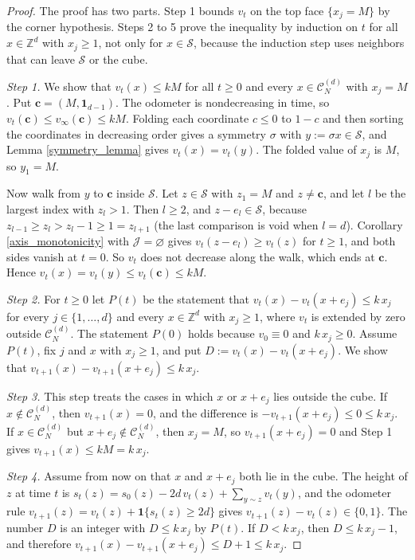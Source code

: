 \documentclass[12pt]{amsart}
\begin{document}
	\begin{proof}
The proof has two parts. Step 1 bounds $v_t$ on the top face $\{x_j=M\}$ by the corner hypothesis. Steps 2 to 5 prove the inequality by induction on $t$ for all $x \in \mathbb{Z}^d$ with $x_j \geq 1$, not only for $x \in \mathcal{S}$, because the induction step uses neighbors that can leave $\mathcal{S}$ or the cube.

\emph{Step 1.} We show that $v_t(x) \leq kM$ for all $t \geq 0$ and every $x \in \mathcal{C}_N^{(d)}$ with $x_j = M$. Put $\mathbf{c} = (M, \mathbf{1}_{d-1})$. The odometer is nondecreasing in time, so $v_t(\mathbf{c}) \leq v_\infty(\mathbf{c}) \leq kM$. Folding each coordinate $c \leq 0$ to $1-c$ and then sorting the coordinates in decreasing order gives a symmetry $\sigma$ with $y := \sigma x \in \mathcal{S}$, and Lemma \ref{symmetry_lemma} gives $v_t(x) = v_t(y)$. The folded value of $x_j$ is $M$, so $y_1 = M$.

Now walk from $y$ to $\mathbf{c}$ inside $\mathcal{S}$. Let $z \in \mathcal{S}$ with $z_1 = M$ and $z \neq \mathbf{c}$, and let $l$ be the largest index with $z_l > 1$. Then $l \geq 2$, and $z - e_l \in \mathcal{S}$, because $z_{l-1} \geq z_l > z_l - 1 \geq 1 = z_{l+1}$ (the last comparison is void when $l = d$). Corollary \ref{axis_monotonicity} with $\mathcal{J} = \varnothing$ gives $v_t(z - e_l) \geq v_t(z)$ for $t \geq 1$, and both sides vanish at $t = 0$. So $v_t$ does not decrease along the walk, which ends at $\mathbf{c}$. Hence $v_t(x) = v_t(y) \leq v_t(\mathbf{c}) \leq kM$.

\emph{Step 2.} For $t \geq 0$ let $P(t)$ be the statement that $v_t(x) - v_t(x+e_j) \leq k\,x_j$ for every $j \in \{1, \ldots, d\}$ and every $x \in \mathbb{Z}^d$ with $x_j \geq 1$, where $v_t$ is extended by zero outside $\mathcal{C}_N^{(d)}$. The statement $P(0)$ holds because $v_0 \equiv 0$ and $k\,x_j \geq 0$. Assume $P(t)$, fix $j$ and $x$ with $x_j \geq 1$, and put $D := v_t(x) - v_t(x+e_j)$. We show that $v_{t+1}(x) - v_{t+1}(x+e_j) \leq k\,x_j$.

\emph{Step 3.} This step treats the cases in which $x$ or $x+e_j$ lies outside the cube. If $x \notin \mathcal{C}_N^{(d)}$, then $v_{t+1}(x) = 0$, and the difference is $-v_{t+1}(x+e_j) \leq 0 \leq k\,x_j$. If $x \in \mathcal{C}_N^{(d)}$ but $x+e_j \notin \mathcal{C}_N^{(d)}$, then $x_j = M$, so $v_{t+1}(x+e_j) = 0$ and Step 1 gives $v_{t+1}(x) \leq kM = k\,x_j$.

\emph{Step 4.} Assume from now on that $x$ and $x+e_j$ both lie in the cube. The height of $z$ at time $t$ is $s_t(z) = s_0(z) - 2d\,v_t(z) + \sum_{y \sim z} v_t(y)$, and the odometer rule $v_{t+1}(z) = v_t(z) + \mathbf{1}\{s_t(z) \geq 2d\}$ gives $v_{t+1}(z) - v_t(z) \in \{0, 1\}$. The number $D$ is an integer with $D \leq k\,x_j$ by $P(t)$. If $D < k\,x_j$, then $D \leq k\,x_j - 1$, and therefore $v_{t+1}(x) - v_{t+1}(x+e_j) \leq D + 1 \leq k\,x_j$.


\end{proof}
\end{document}
